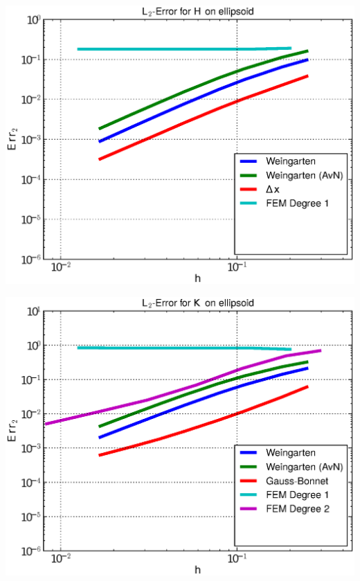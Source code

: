 \documentclass{beamer}
\begin{document}
\begin{frame}
\begin{overprint}
\begin{minipage}[t]{0.49\textwidth}
            \centering\includegraphics[width=\textwidth]{bilder/Curvature/heineC/ErrHL2_4.eps}
          \end{minipage}
          \begin{minipage}[t]{0.49\textwidth}
            \centering\includegraphics[width=\textwidth]{bilder/Curvature/heineC/ErrKL2_5.eps}
          \end{minipage}\hfill
          \begin{minipage}[t]{0.49\textwidth}

\end{minipage}
\end{overprint}
\end{frame}
\end{document}
